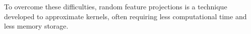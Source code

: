
To overcome these difficulties, random feature projections is a technique developed to approximate kernels, often requiring less computational time and less memory storage.

